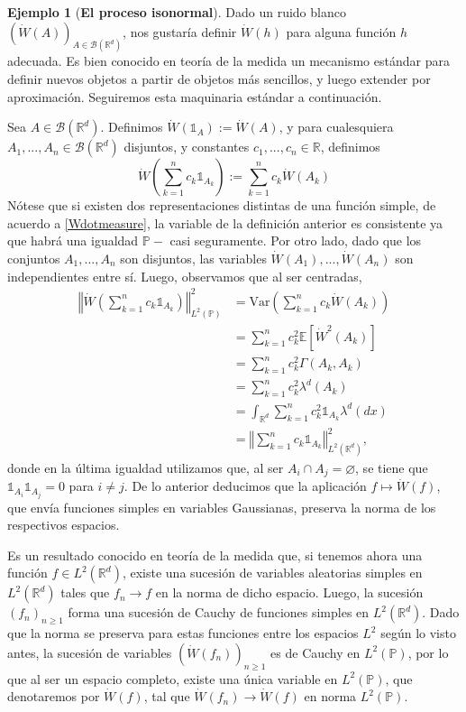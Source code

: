 \documentclass[letterpaper,twoside,12pt]{book}
\newcommand{\R}{\mathbb{R}}
\newcommand{\B}{\mathcal{B}}
\newcommand{\E}{\mathbb{E}}
\renewcommand{\P}{\mathbb{P}}
\newcommand{\W}{\dot{W}}
\newcommand{\1}{\mathds{1}}
\renewcommand{\to}{\rightarrow}
\newcommand{\norm}[1]{\left\Vert #1 \right\Vert}
\theoremstyle{definition}
\theoremstyle{definition}
\theoremstyle{definition}
\theoremstyle{definition}
\theoremstyle{definition}
\theoremstyle{definition}
\newtheorem{ejem}{Ejemplo}
\theoremstyle{definition}
\begin{document}
\begin{ejem}[\textbf{El proceso isonormal}] 
Dado un ruido blanco $\left(\W(A)\right)_{A\in \B(\R^d)}$, nos gustaría definir $\W(h)$ para alguna función $h$ adecuada. Es bien conocido en teoría de la medida un mecanismo estándar para definir nuevos objetos a partir de objetos más sencillos, y luego extender por aproximación. Seguiremos esta maquinaria estándar a continuación.

Sea $A\in \B(\R^d)$. Definimos $\W(\1_A):=\W(A)$, y para cualesquiera $A_1,...,A_n\in \B(\R^{d})$ disjuntos, y constantes $c_1,...,c_n\in \R$,  definimos
\[
\W \left(\sum_{k=1}^{n}c_k\1_{A_k}\right):=\sum_{k=1}^{n}c_k\W(A_k)    
\]
Nótese que si existen dos representaciones distintas de una función simple, de acuerdo a \eqref{Wdotmeasure}, la variable de la definición anterior es consistente ya que habrá una igualdad $\P-$ casi seguramente. Por otro lado, dado que los conjuntos $A_1,...,A_n$ son disjuntos, las variables $\W(A_1),...,\W(A_n)$ son independientes entre sí. Luego, observamos que al ser centradas,
\begin{align*}
    \norm{\W \left(\sum_{k=1}^{n}c_k\1_{A_k}\right)}_{L^{2}(\P)}^2&=\text{Var}\left(\sum_{k=1}^{n}c_k\W(A_k)\right)\\
    &=\sum_{k=1}^{n}c_k^2 \E\left[\W^2(A_k)\right]\\
    &=\sum_{k=1}^{n}c_k^2 \Gamma(A_k,A_k)\\
    &=\sum_{k=1}^{n}c_k^2\lambda^{d}(A_k)\\
    &=\int_{\R^d}\sum_{k=1}^{n}c_k^2\1_{A_k}\lambda^d(dx)\\
    &=\norm{\sum_{k=1}^{n}c_k\1_{A_k}}^2_{L^{2}(\R^{d})},
\end{align*}
donde en la última igualdad utilizamos que, al ser $A_i\cap A_j=\varnothing$, se tiene que $\1_{A_i}\1_{A_j}=0$ para $i\neq j$. De lo anterior deducimos que la aplicación $f\longmapsto \W(f)$, que envía funciones simples en variables Gaussianas, preserva la norma de los respectivos espacios.

Es un resultado conocido en teoría de la medida que, si tenemos ahora una función $f\in L^{2}(\R^{d})$, existe una sucesión de variables aleatorias simples en $L^{2}(\R^d)$ tales que $f_n\to f$ en la norma de dicho espacio. Luego, la sucesión $(f_n)_{n\ge 1}$ forma una sucesión de Cauchy de funciones simples en $L^2(\R^{d})$. Dado que la norma se preserva para estas funciones entre los espacios $L^2$ según lo visto antes, la sucesión de variables $(\W(f_n))_{n\ge 1}$ es de Cauchy en $L^{2}(\P)$, por lo que al ser un espacio completo, existe una única variable en $L^{2}(\P)$, que denotaremos por $\W(f)$, tal que $\W(f_n)\longrightarrow \W(f)$ en norma $L^{2}(\P)$.


\end{ejem}
\end{document}
